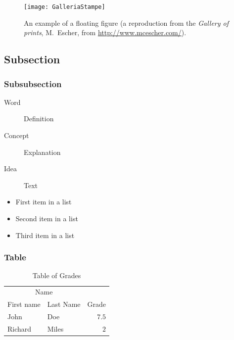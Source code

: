 \documentclass[
10pt, %
a4paper, %
oneside, %
headinclude,footinclude, %
BCOR5mm, %
]{scrartcl}
\begin{document}
\begin{figure}[tb]
\centering 
\texttt{[image: GalleriaStampe]} 
\caption[An example of a floating figure]{An example of a floating figure (a reproduction from the \emph{Gallery of prints}, M.~Escher, from \url{http://www.mcescher.com/}).} %
\label{fig:gallery} 
\end{figure}

\lipsum[10] %


\subsection{Subsection}
\lipsum[11] %

\subsubsection{Subsubsection}

\lipsum[12] %

\begin{description}
\item[Word] Definition
\item[Concept] Explanation
\item[Idea] Text
\end{description}

\lipsum[12] %

\begin{itemize}[noitemsep] %
\item First item in a list
\item Second item in a list
\item Third item in a list
\end{itemize}

\subsubsection{Table}

\lipsum[13] %

\begin{table}[hbt]
\caption{Table of Grades}
\centering
\begin{tabular}{llr}
\toprule
\multicolumn{2}{c}{Name} \\
\cmidrule(r){1-2}
First name & Last Name & Grade \\
\midrule
John & Doe & $7.5$ \\
Richard & Miles & $2$ \\
\bottomrule
\end{tabular}
\label{tab:label}
\end{table}
\end{document}
